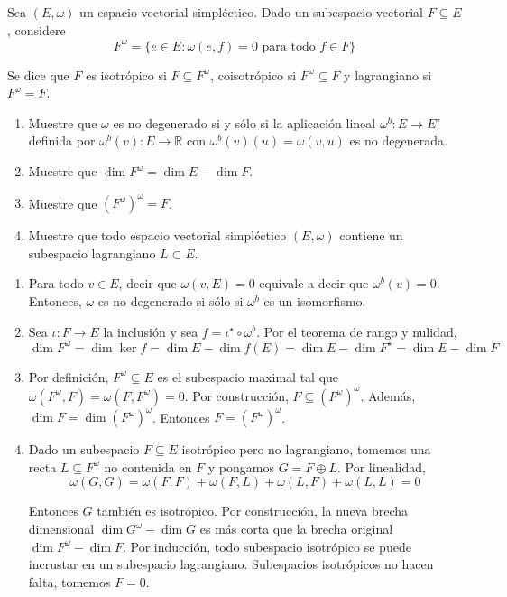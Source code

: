 \begin{problem}
Sea $(E, \omega)$ un espacio vectorial simpléctico. Dado un subespacio vectorial $F \subseteq E$, considere
$$F^\omega = \{ e \in E : \omega(e, f) = 0 \text{ para todo } f \in F \}$$

Se dice que $F$ es isotrópico si $F \subseteq F^\omega$, coisotrópico si $F^\omega \subseteq F$ y lagrangiano si $F^\omega = F$.

\begin{enumerate}
    \item Muestre que $\omega$ es no degenerado si y sólo si la aplicación lineal $\omega^b : E \to E^\star$ definida por $\omega^b(v) : E \to \mathbb R$ con $\omega^b(v)(u) = \omega(v, u)$ es no degenerada.
    
    \item Muestre que $\dim F^\omega = \dim E - \dim F$.
    
    \item Muestre que $(F^\omega)^\omega = F$.
    
    \item Muestre que todo espacio vectorial simpléctico $(E, \omega)$ contiene un subespacio lagrangiano $L \subset E$.
\end{enumerate}
\end{problem}

\begin{solution}
\leavevmode
\begin{enumerate}
    \item Para todo $v \in E$, decir que $\omega(v, E) = 0$ equivale a decir que $\omega^b(v) = 0$. Entonces, $\omega$ es no degenerado si sólo si $\omega^b$ es un isomorfismo.
    
    \item Sea $\iota : F \to E$ la inclusión y sea $f = \iota^\star \circ \omega^b$. Por el teorema de rango y nulidad,
    $$\dim F^\omega = \dim \ker f = \dim E - \dim f(E) = \dim E - \dim F^\star = \dim E - \dim F$$
    
    \item Por definición, $F^\omega \subseteq E$ es el subespacio maximal tal que $\omega(F^\omega, F) = \omega(F, F^\omega) = 0$. Por construcción, $F \subseteq (F^\omega)^\omega$. Además, $\dim F = \dim (F^\omega)^\omega$. Entonces $F = (F^\omega)^\omega$.
    
    \item Dado un subespacio $F \subseteq E$ isotrópico pero no lagrangiano, tomemos una recta $L \subseteq F^\omega$ no contenida en $F$ y pongamos $G = F \oplus L$. Por linealidad,
    $$\omega(G, G) = \omega(F, F) + \omega(F, L) + \omega(L, F) + \omega(L, L) = 0$$
    
    Entonces $G$ también es isotrópico. Por construcción, la nueva brecha dimensional $\dim G^\omega - \dim G$ es más corta que la brecha original $\dim F^\omega - \dim F$. Por inducción, todo subespacio isotrópico se puede incrustar en un subespacio lagrangiano. Subespacios isotrópicos no hacen falta, tomemos $F = 0$.
\end{enumerate}
\end{solution}
